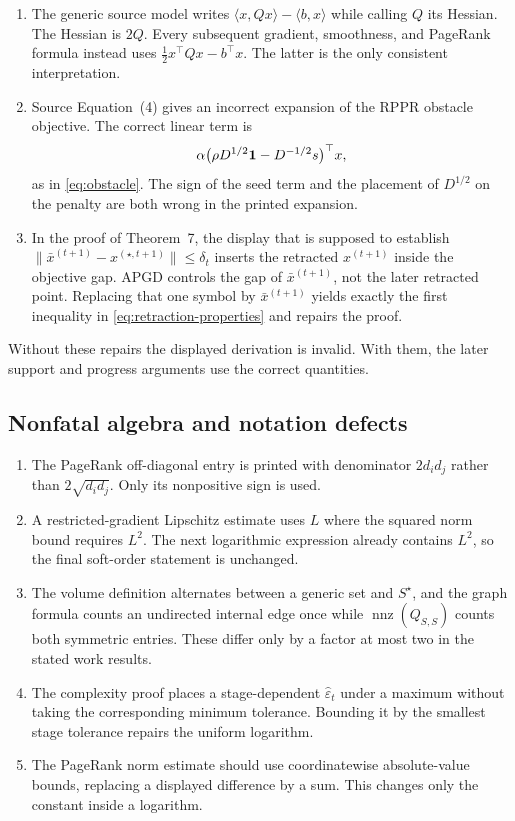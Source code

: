 \documentclass[11pt]{article}
\begin{document}
\begin{enumerate}[leftmargin=*]
\item The generic source model writes $\langle x,Qx\rangle-\langle b,x\rangle$
while calling $Q$ its Hessian.  The Hessian is $2Q$.  Every subsequent
gradient, smoothness, and PageRank formula instead uses
$\frac12x^\top Qx-b^\top x$.  The latter is the only consistent
interpretation.

\item Source Equation~(4) gives an incorrect expansion of the RPPR obstacle
objective.  The correct linear term is
\[
 \alpha\bigl(\rho D^{1/2}\mathbf{1}-D^{-1/2}s\bigr)^\top x,
\]
as in \cref{eq:obstacle}.  The sign of the seed term and the placement of
$D^{1/2}$ on the penalty are both wrong in the printed expansion.

\item In the proof of Theorem~7, the display that is supposed to establish
$\|\bar x^{(t+1)}-x^{(\star,t+1)}\|\leq\delta_t$ inserts the retracted
$x^{(t+1)}$ inside the objective gap.  APGD controls the gap of
$\bar x^{(t+1)}$, not the later retracted point.  Replacing that one symbol by
$\bar x^{(t+1)}$ yields exactly the first inequality in
\cref{eq:retraction-properties} and repairs the proof.
\end{enumerate}

Without these repairs the displayed derivation is invalid.  With them, the
later support and progress arguments use the correct quantities.

\subsection{Nonfatal algebra and notation defects}

\begin{enumerate}[leftmargin=*]
\item The PageRank off-diagonal entry is printed with denominator
$2d_id_j$ rather than $2\sqrt{d_id_j}$.  Only its nonpositive sign is used.
\item A restricted-gradient Lipschitz estimate uses $L$ where the squared
norm bound requires $L^2$.  The next logarithmic expression already contains
$L^2$, so the final soft-order statement is unchanged.
\item The volume definition alternates between a generic set and
$S^\star$, and the graph formula counts an undirected internal edge once
while $\operatorname{nnz}(Q_{S,S})$ counts both symmetric entries.  These
differ only by a factor at most two in the stated work results.
\item The complexity proof places a stage-dependent
$\widehat\varepsilon_t$ under a maximum without taking the corresponding
minimum tolerance.  Bounding it by the smallest stage tolerance repairs the
uniform logarithm.
\item The PageRank norm estimate should use coordinatewise absolute-value
bounds, replacing a displayed difference by a sum.  This changes only the
constant inside a logarithm.
\end{enumerate}
\end{document}
